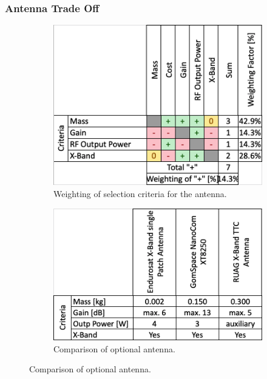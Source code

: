 \subsubsection{Antenna Trade Off}
\begin{figure}[h]
     \centering
     \begin{subfigure}[b]{0.49\textwidth}
         \centering
         \includegraphics[width=\textwidth]{Media/Trade_off/Antenna/Weighting_Ant.png}
         \caption{Weighting of selection criteria for the antenna.}
         \label{fig:Weighting_Rec}
     \end{subfigure}
     \hfill
     \begin{subfigure}[b]{0.49\textwidth}
         \centering
         \includegraphics[width=\textwidth]{Media/Trade_off/Antenna/Values_Ant.png}
         \caption{Comparison of optional antenna.}

\end{subfigure}
\end{figure}
